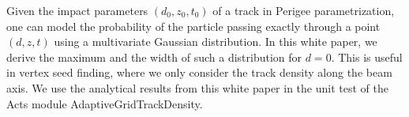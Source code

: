
Given the impact parameters $(d_0, z_0, t_0)$ of a track in Perigee parametrization, one can model the probability of the particle passing exactly through a point $(d, z, t)$ using a multivariate Gaussian distribution. In this white paper, we derive the maximum and the width of such a distribution for $d = 0$. This is useful in vertex seed finding, where we only consider the track density along the beam axis. We use the analytical results from this white paper in the unit test of the Acts module AdaptiveGridTrackDensity.